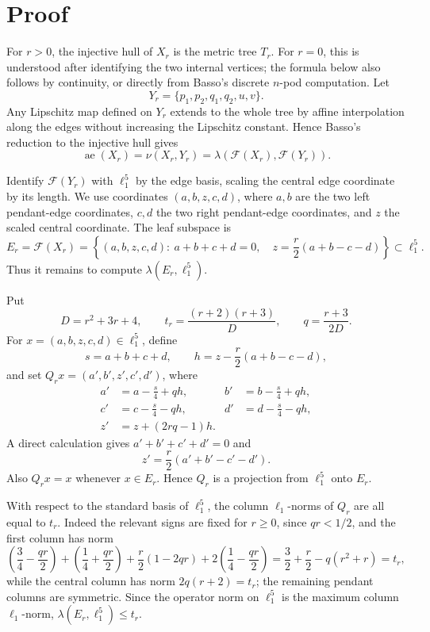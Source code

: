 \documentclass[11pt]{article}
\newcommand{\aext}{\operatorname{ae}}
\newcommand{\F}{\mathcal F}
\begin{document}
\section*{Proof}

For \(r>0\), the injective hull of \(X_r\) is the metric tree \(T_r\).  For
\(r=0\), this is understood after identifying the two internal vertices; the
formula below also follows by continuity, or directly from Basso's discrete
\(n\)-pod computation.  Let
\[
  Y_r=\{p_1,p_2,q_1,q_2,u,v\}.
\]
Any Lipschitz map defined on \(Y_r\) extends to the whole tree by affine
interpolation along the edges without increasing the Lipschitz constant. Hence
Basso's reduction to the injective hull gives
\[
  \aext(X_r)=\nu(X_r,Y_r)
          =\lambda(\F(X_r),\F(Y_r)).
\]

Identify \(\F(Y_r)\) with \(\ell_1^5\) by the edge basis, scaling the central
edge coordinate by its length.  We use coordinates \((a,b,z,c,d)\), where
\(a,b\) are the two left pendant-edge coordinates, \(c,d\) the two right
pendant-edge coordinates, and \(z\) the scaled central coordinate.  The leaf
subspace is
\[
 E_r=\F(X_r)
 =\left\{(a,b,z,c,d):\ a+b+c+d=0,\quad
 z=\frac r2(a+b-c-d)\right\}\subset \ell_1^5 .
\]
Thus it remains to compute \(\lambda(E_r,\ell_1^5)\).

Put
\[
  D=r^2+3r+4,\qquad
  t_r=\frac{(r+2)(r+3)}{D},\qquad
  q=\frac{r+3}{2D}.
\]
For \(x=(a,b,z,c,d)\in\ell_1^5\), define
\[
  s=a+b+c+d,\qquad
  h=z-\frac r2(a+b-c-d),
\]
and set \(Q_r x=(a',b',z',c',d')\), where
\[
\begin{aligned}
a'&=a-\frac{s}{4}+qh,              & b'&=b-\frac{s}{4}+qh,\\
c'&=c-\frac{s}{4}-qh,              & d'&=d-\frac{s}{4}-qh,\\
z'&=z+(2rq-1)h.
\end{aligned}
\]
A direct calculation gives \(a'+b'+c'+d'=0\) and
\[
 z'=\frac r2(a'+b'-c'-d').
\]
Also \(Q_r x=x\) whenever \(x\in E_r\).  Hence \(Q_r\) is a projection from
\(\ell_1^5\) onto \(E_r\).

With respect to the standard basis of \(\ell_1^5\), the column \(\ell_1\)-norms
of \(Q_r\) are all equal to \(t_r\).  Indeed the relevant signs are fixed for
\(r\geq0\), since \(qr<1/2\), and the first column has norm
\[
 \left(\frac34-\frac{qr}{2}\right)
 +\left(\frac14+\frac{qr}{2}\right)
 +\frac r2(1-2qr)
 +2\left(\frac14-\frac{qr}{2}\right)
 = \frac32+\frac r2-q(r^2+r)=t_r,
\]
while the central column has norm \(2q(r+2)=t_r\); the remaining pendant
columns are symmetric.  Since the operator norm on \(\ell_1^5\) is the maximum
column \(\ell_1\)-norm, \(\lambda(E_r,\ell_1^5)\leq t_r\).
\end{document}
